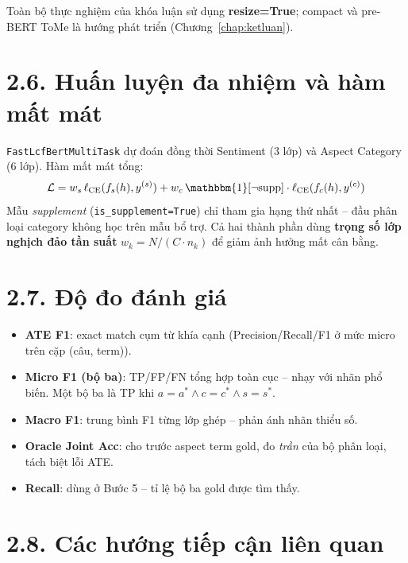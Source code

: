 Toàn bộ thực nghiệm của khóa luận sử dụng \textbf{resize=True}; compact
và pre-BERT ToMe là hướng phát triển (Chương~\ref{chap:ketluan}).

\section{2.6.\; Huấn luyện đa nhiệm và hàm mất mát}
\label{sec:multitask_theory}

\texttt{FastLcfBertMultiTask} dự đoán đồng thời Sentiment (3 lớp) và
Aspect Category (6 lớp). Hàm mất mát tổng:
\begin{equation}
\mathcal{L} = w_s\,\ell_{\text{CE}}(f_s(h),y^{(s)})
  + w_c\,\mathbbm{1}[\neg\text{supp}]\cdot\ell_{\text{CE}}(f_c(h),y^{(c)})
\label{eq:mt_loss}
\end{equation}
Mẫu \textit{supplement} (\texttt{is\_supplement=True}) chỉ tham gia
hạng thứ nhất -- đầu phân loại category không học trên mẫu bổ trợ.
Cả hai thành phần dùng \textbf{trọng số lớp nghịch đảo tần suất}
$w_k = N/(C\cdot n_k)$ để giảm ảnh hưởng mất cân bằng.

\section{2.7.\; Độ đo đánh giá}
\label{sec:metrics_theory}

\begin{itemize}
  \item \textbf{ATE F1}: exact match cụm từ khía cạnh (Precision/Recall/F1
        ở mức micro trên cặp (câu, term)).
  \item \textbf{Micro F1 (bộ ba)}: TP/FP/FN tổng hợp toàn cục -- nhạy
        với nhãn phổ biến. Một bộ ba là TP khi $a=a^*\land c=c^*\land s=s^*$.
  \item \textbf{Macro F1}: trung bình F1 từng lớp ghép -- phản ánh nhãn
        thiểu số.
  \item \textbf{Oracle Joint Acc}: cho trước aspect term gold, đo
        \emph{trần} của bộ phân loại, tách biệt lỗi ATE.
  \item \textbf{Recall}: dùng ở Bước 5 -- tỉ lệ bộ ba gold được tìm thấy.
\end{itemize}

\section{2.8.\; Các hướng tiếp cận liên quan}
\label{sec:related_work}

